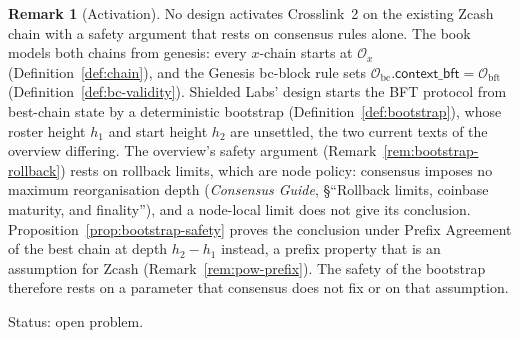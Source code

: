 \documentclass[11pt,a4paper]{article}
\theoremstyle{definition}
\newtheorem{remark}[theorem]{Remark}
\newcommand{\bc}{\mathrm{bc}}
\newcommand{\bft}{\mathrm{bft}}
\newcommand{\Origin}{\mathcal{O}}
\newcommand{\Obc}{\Origin_{\bc}}
\newcommand{\Obft}{\Origin_{\bft}}
\newcommand{\contextbft}{\mathsf{context\_bft}}
\begin{document}
\begin{remark}[Activation]\label{rem:activation}
No design activates Crosslink~2 on the existing Zcash chain with a safety
argument that rests on consensus rules alone. The book models both chains
from genesis: every $x$-chain starts at $\Origin_x$
(Definition~\ref{def:chain}), and the Genesis bc-block rule sets
$\Obc.\contextbft = \Obft$ (Definition~\ref{def:bc-validity}). Shielded Labs'
design starts the BFT protocol from best-chain state by a deterministic
bootstrap (Definition~\ref{def:bootstrap}), whose roster height $h_1$ and
start height $h_2$ are unsettled, the two current texts of the overview
differing. The overview's safety argument (Remark~\ref{rem:bootstrap-rollback})
rests on rollback limits, which are node policy: consensus imposes no maximum
reorganisation depth (\emph{Consensus Guide}, \S``Rollback limits, coinbase
maturity, and finality''), and a node-local limit does not give its conclusion.
Proposition~\ref{prop:bootstrap-safety} proves the conclusion under Prefix
Agreement of the best chain at depth $h_2 - h_1$ instead, a prefix property
that is an assumption for Zcash (Remark~\ref{rem:pow-prefix}). The safety of
the bootstrap therefore rests on a parameter that consensus does not fix or
on that assumption.

Status: open problem.
\end{remark}
\end{document}
